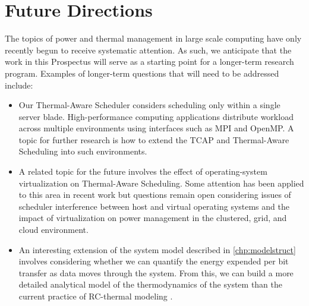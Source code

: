 \section{Future Directions}
\label{sec:future-directions}
The topics of power and thermal management in large scale computing have
only recently begun to receive systematic attention.  As such, we
anticipate that the work in this Prospectus will serve as a starting
point for a longer-term research program.   Examples of longer-term
questions that will need to be addressed include:
\begin{itemize}
\item Our Thermal-Aware Scheduler considers scheduling only within a single
  server blade. High-performance computing applications distribute
  workload across multiple environments using interfaces such as MPI and
  OpenMP.  A topic for further research is how to extend the TCAP and
  Thermal-Aware Scheduling into such environments.
\item A related topic for the future involves the effect of
  operating-system virtualization on Thermal-Aware Scheduling.  Some
  attention has been applied to this area in recent work
  \cite{Merkel2010} but questions remain open considering issues of
  scheduler interference between host and virtual operating systems and
  the impact of virtualization on power management in the clustered,
  grid, and cloud environment.
\item An interesting extension of the system model described in
  \ref{chp:modelstruct} involves considering whether we can quantify the
  energy expended per bit transfer as data moves through the
  system. From this, we can build a more detailed analytical model of
  the thermodynamics of the system than the current practice of
  RC-thermal modeling \cite{Skadron2004}.  
\end{itemize}

